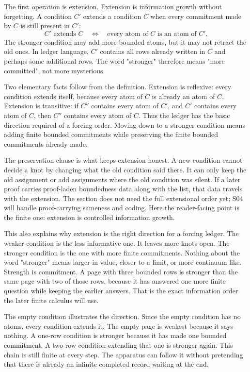 The first operation is extension. Extension is information growth without
forgetting. A condition \(C'\) extends a condition \(C\) when every commitment
made by \(C\) is still present in \(C'\):
\[
  C' \text{ extends } C
  \quad\Longleftrightarrow\quad
  \text{every atom of } C \text{ is an atom of } C'.
\]
The stronger condition may add more bounded atoms, but it may not retract the
old ones. In ledger language, \(C'\) contains all rows already written in \(C\)
and perhaps some additional rows. The word "stronger" therefore means "more
committed", not more mysterious.

Two elementary facts follow from the definition. Extension is reflexive: every
condition extends itself, because every atom of \(C\) is already an atom of
\(C\). Extension is transitive: if \(C''\) contains every atom of \(C'\), and
\(C'\) contains every atom of \(C\), then \(C''\) contains every atom of \(C\).
Thus the ledger has the basic direction required of a forcing order. Moving
down to a stronger condition means adding finite bounded commitments while
preserving the finite bounded commitments already made.

The preservation clause is what keeps extension honest. A new condition cannot
decide a knot by changing what the old condition said there. It can only keep
the old assignment or add assignments where the old condition was silent. If a
later proof carries proof-laden boundedness data along with the list, that data
travels with the extension. The section does not need the full extensional
order yet; S04 will handle proof-carrying sameness and coding. Here the
reader-facing point is the finite one: extension is controlled information
growth.

This also explains why extension is the right direction for a forcing ledger.
The weaker condition is the less informative one. It leaves more knots open.
The stronger condition is the one with more finite commitments. Nothing about
the word "stronger" means larger in value, closer to a limit, or more
continuum-like. Strength is commitment. A page with three bounded rows is
stronger than the same page with two of those rows, because it has answered one
more finite question while keeping the earlier answers. That is the exact
information order the later finite calculus will use.

The empty condition illustrates the direction. Since the empty condition has no
atoms, every condition extends it. The empty page is weakest because it says
nothing. A one-row condition is stronger because it has made one bounded
commitment. A two-row condition extending that one is stronger again. This
chain is still finite at every step. The apparatus can follow it without
pretending that there is already an infinite completed record waiting at the
end.

